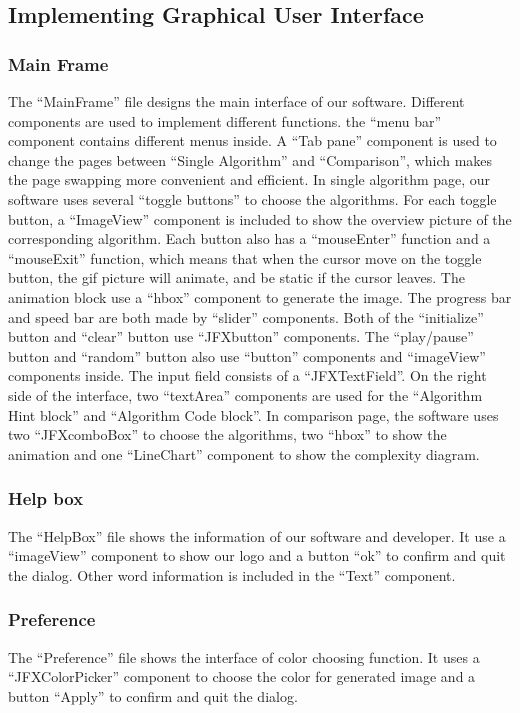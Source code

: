 \documentclass[paper=a4, fontsize=11pt,twoside]{scrartcl}		%
\begin{document}
\subsection{Implementing Graphical User Interface}

\subsubsection{Main Frame}
The “MainFrame” file designs the main interface of our software. Different components are used to implement different functions. the “menu bar” component contains different menus inside. A “Tab pane” component is used to change the pages between “Single Algorithm” and “Comparison”, which makes the page swapping more convenient and efficient. In single algorithm page, our software uses several “toggle buttons” to choose the algorithms. For each toggle button, a “ImageView” component is included to show the overview picture of the corresponding algorithm. Each button also has a “mouseEnter” function and a “mouseExit” function, which means that when the cursor move on the toggle button, the gif picture will animate, and be static if the cursor leaves. The animation block use a “hbox” component to generate the image. The progress bar and speed bar are both made by “slider” components. Both of the “initialize” button and “clear” button use “JFXbutton” components. The “play/pause” button and “random” button also use “button” components and “imageView” components inside. The input field consists of a “JFXTextField”. On the right side of the interface, two “textArea” components are used for the “Algorithm Hint block” and “Algorithm Code block”.  In comparison page, the software uses two “JFXcomboBox” to choose the algorithms, two “hbox” to show the animation and one “LineChart” component to show the complexity diagram. 
\subsubsection{Help box}
The “HelpBox” file shows the information of our software and developer. It use a “imageView” component to show our logo and a button “ok” to confirm and quit the dialog. Other word information is included in the “Text” component. 
\subsubsection{Preference}
The “Preference” file shows the interface of color choosing function. It uses a “JFXColorPicker” component to choose the color for generated image and a button “Apply” to confirm and quit the dialog.
\end{document}
